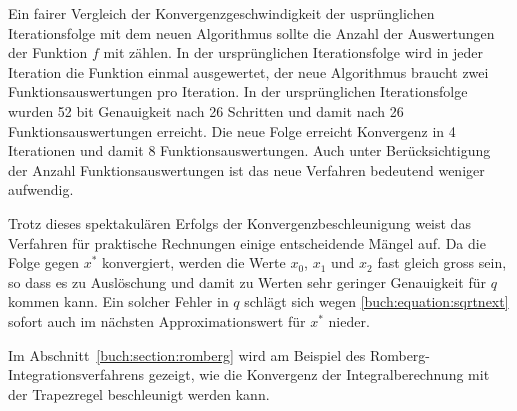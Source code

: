 Ein fairer Vergleich der Konvergenzgeschwindigkeit der usprünglichen
Iterationsfolge mit dem neuen Algorithmus sollte die Anzahl der
Auswertungen der Funktion $f$ mit zählen. 
%
%
In der ursprünglichen Iterationsfolge wird in jeder Iteration die 
Funktion einmal ausgewertet, der neue Algorithmus braucht zwei
Funktionsauswertungen pro Iteration.
In der ursprünglichen Iterationsfolge wurden 52 bit Genauigkeit nach
26 Schritten und damit nach 26 Funktionsauswertungen erreicht.
Die neue Folge erreicht Konvergenz in 4 Iterationen und damit 8
Funktionsauswertungen.
Auch unter Berücksichtigung der Anzahl Funktionsauswertungen ist
das neue Verfahren bedeutend weniger aufwendig.

Trotz dieses spektakulären Erfolgs der Konvergenzbeschleunigung weist das
Verfahren für praktische Rechnungen einige entscheidende Mängel auf.
Da die Folge gegen $x^*$ konvergiert, werden 
die Werte $x_0$, $x_1$ und $x_2$ fast gleich gross sein, so dass es
zu Auslöschung und damit zu Werten sehr geringer Genauigkeit für $q$
kommen kann.
%
Ein solcher Fehler in $q$ schlägt sich wegen
\eqref{buch:equation:sqrtnext}
sofort auch im nächsten Approximationswert für $x^*$ nieder.

Im Abschnitt~\ref{buch:section:romberg} wird am Beispiel des
Romberg-Integrationsverfahrens gezeigt, wie die Konvergenz der
Integralberechnung mit der Trapezregel beschleunigt werden kann.
%
%




